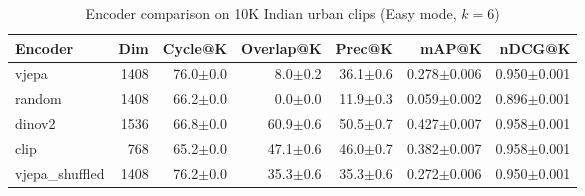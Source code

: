 \begin{table}[ht]
\centering
\caption{Encoder comparison on 10K Indian urban clips (Easy mode, $k=6$)}
\label{tab:encoder_comparison}
\begin{tabular}{lrrrrrr}
\toprule
Encoder & Dim & Cycle@K & Overlap@K & Prec@K & mAP@K & nDCG@K \\
\midrule
vjepa & 1408 & 76.0{\tiny$\pm$0.0} & 8.0{\tiny$\pm$0.2} & 36.1{\tiny$\pm$0.6} & 0.278{\tiny$\pm$0.006} & 0.950{\tiny$\pm$0.001} \\
random & 1408 & 66.2{\tiny$\pm$0.0} & 0.0{\tiny$\pm$0.0} & 11.9{\tiny$\pm$0.3} & 0.059{\tiny$\pm$0.002} & 0.896{\tiny$\pm$0.001} \\
dinov2 & 1536 & 66.8{\tiny$\pm$0.0} & 60.9{\tiny$\pm$0.6} & 50.5{\tiny$\pm$0.7} & 0.427{\tiny$\pm$0.007} & 0.958{\tiny$\pm$0.001} \\
clip & 768 & 65.2{\tiny$\pm$0.0} & 47.1{\tiny$\pm$0.6} & 46.0{\tiny$\pm$0.7} & 0.382{\tiny$\pm$0.007} & 0.958{\tiny$\pm$0.001} \\
vjepa\_shuffled & 1408 & 76.2{\tiny$\pm$0.0} & 35.3{\tiny$\pm$0.6} & 35.3{\tiny$\pm$0.6} & 0.272{\tiny$\pm$0.006} & 0.950{\tiny$\pm$0.001} \\
\bottomrule
\end{tabular}
\end{table}